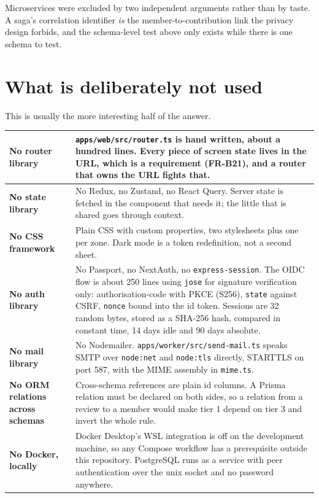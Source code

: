 \documentclass[11pt,a4paper]{article}
\begin{document}
\begin{why}
Microservices were excluded by two independent arguments rather than by
taste. A saga's correlation identifier \emph{is} the member-to-contribution
link the privacy design forbids, and the schema-level test above only exists
while there is one schema to test.
\end{why}

\newpage
\section{What is deliberately not used}

This is usually the more interesting half of the answer.

\begin{center}
\sffamily\small
\begin{tabular}{@{}>{\bfseries}p{3.1cm} p{11.2cm}@{}}
\toprule
No router library & \texttt{apps/web/src/router.ts} is hand written, about a
  hundred lines. Every piece of screen state lives in the URL, which is a
  requirement (FR-B21), and a router that owns the URL fights that. \\
\midrule
No state library & No Redux, no Zustand, no React Query. Server state is
  fetched in the component that needs it; the little that is shared goes
  through context. \\
\midrule
No CSS framework & Plain CSS with custom properties, two stylesheets plus one
  per zone. Dark mode is a token redefinition, not a second sheet. \\
\midrule
No auth library & No Passport, no NextAuth, no \texttt{express-session}. The
  OIDC flow is about 250 lines using \texttt{jose} for signature verification
  only: authorisation-code with PKCE (S256), \texttt{state} against CSRF,
  \texttt{nonce} bound into the id token. Sessions are 32 random bytes,
  stored as a SHA-256 hash, compared in constant time, 14 days idle and 90
  days absolute. \\
\midrule
No mail library & No Nodemailer. \texttt{apps/worker/src/send-mail.ts} speaks
  SMTP over \texttt{node:net} and \texttt{node:tls} directly, STARTTLS on port
  587, with the MIME assembly in \texttt{mime.ts}. \\
\midrule
No ORM relations across schemas & Cross-schema references are plain id
  columns. A Prisma relation must be declared on both sides, so a relation
  from a review to a member would make tier 1 depend on tier 3 and invert the
  whole rule. \\
\midrule
No Docker, locally & Docker Desktop's WSL integration is off on the
  development machine, so any Compose workflow has a prerequisite outside this
  repository. PostgreSQL runs as a service with peer authentication over the
  unix socket and no password anywhere. \\
\bottomrule
\end{tabular}
\end{center}
\end{document}
